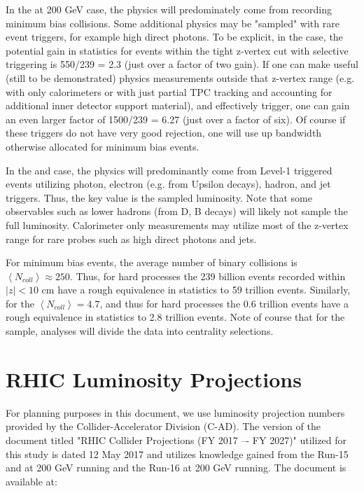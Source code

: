 In the \auau at 200 GeV case, the physics will predominately come from recording minimum bias collisions.   Some additional physics may be "sampled" with rare event triggers, for
example high \pt direct photons.    To be explicit, in the \auau case, the potential gain in statistics for events within the tight z-vertex cut with selective triggering is 550/239 = 2.3  (just over a factor of two gain).    If one can make useful (still to be demonstrated) physics measurements outside that z-vertex range (e.g. with only calorimeters or with just partial TPC tracking and accounting for additional inner detector support material), and effectively trigger, one can gain an even larger factor of 1500/239 = 6.27 (just over a factor of six).   Of course if these triggers do not have very good rejection, one will use up bandwidth otherwise allocated for minimum bias \auau events.

In the \pp and \pau case, the physics will predominantly come from Level-1 triggered events utilizing photon, electron (e.g. from Upsilon decays), hadron, and
jet triggers.  Thus, the key value is the sampled luminosity.   Note that some observables such as lower \pt hadrons (from D, B decays) will likely not sample the full luminosity.  Calorimeter only measurements may utilize most of the z-vertex range for rare probes such as high \pt direct photons and jets.

For \auau minimum bias events, the average number of binary collisions is 
$\left< N_{coll} \right> \approx 250$.  Thus, for hard processes the 239 billion \auau events recorded within $|z|<10$ cm have a rough equivalence in statistics to 59 trillion \pp events.  Similarly, for \pau the $\left< N_{coll} \right> = 4.7$, and thus for hard processes the 0.6 trillion \pau events have a rough equivalence in statistics to 2.8 trillion \pp events.   Note of course that for the \auau sample, analyses will divide the data into centrality selections.

\section{RHIC Luminosity Projections}

For planning purposes in this document, we use luminosity projection numbers provided by the Collider-Accelerator Division (C-AD).   The version of the document titled 
"RHIC Collider Projections (FY 2017 –- FY 2027)" utilized for this study is dated 12 May 2017 and utilizes knowledge gained from the Run-15 \pp and \pau at 200 GeV running and the Run-16 \auau at 200 GeV running.   The document is available at:

